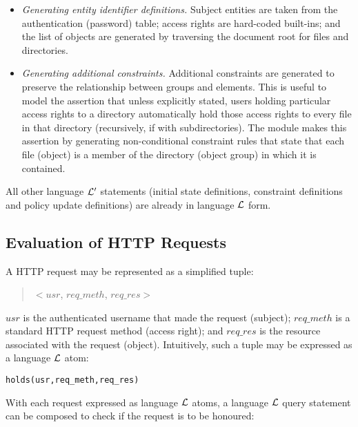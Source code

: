 \documentclass[global,twocolumn,final]{svjour}
\newenvironment{vverbatim}
  {\begin{alltt}}
  {\vspace{-\baselineskip}\end{alltt}}
\begin{document}
      \begin{itemize}
        \item
          {\em Generating entity identifier definitions.} Subject entities are
          taken from the authentication (password) table; access rights are
          hard-coded built-ins; and the list of objects are generated by
          traversing the document root for files and directories.
        \item
          {\em Generating additional constraints.} Additional constraints are
          generated to preserve the relationship between groups and elements.
          This is useful to model the assertion that unless explicitly stated,
          users holding particular access rights to a directory automatically
          hold those access rights to every file in that directory
          (recursively, if with subdirectories). The module makes this
          assertion by generating non-conditional constraint rules that state
          that each file (object) is a member of the directory (object group)
          in which it is contained.
      \end{itemize}

      All other language ${\cal L'}$ statements (initial state definitions,
      constraint definitions and policy update definitions) are already in
      language ${\cal L}$ form.

    \subsection{Evaluation of HTTP Requests}

      A HTTP request may be represented as a simplified tuple:

      \begin{quote}
        $<$$usr$, $req\_meth$, $req\_res$$>$
      \end{quote}

      $usr$ is the authenticated username that made the request (subject);
      $req\_meth$ is a standard HTTP request method (access right); and
      $req\_res$ is the resource associated with the request (object).
      Intuitively, such a tuple may be expressed as a language ${\cal L}$ atom:

      \begin{vverbatim}
  holds(usr, req\_meth, req\_res)
      \end{vverbatim}

      With each request expressed as language ${\cal L}$ atoms, a language
      ${\cal L}$ query statement can be composed to check if the request is
      to be honoured:
\end{document}
